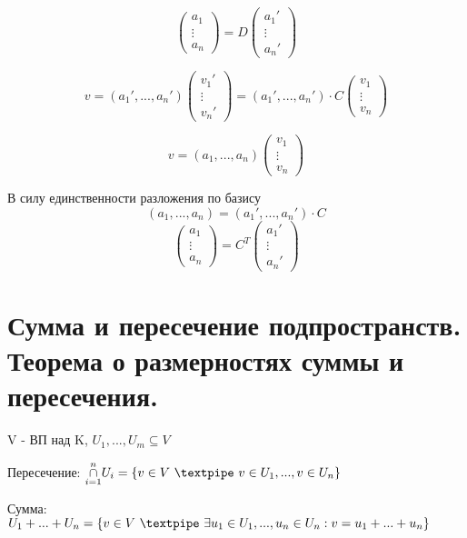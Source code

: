 \documentclass[algebra]{subfiles}
\begin{document}
      \begin{Theorem} 
          \[\begin{pmatrix}
            a_1\\
            \vdots\\
            a_n
          \end{pmatrix} = D
           \begin{pmatrix}
              a_1'\\
            \vdots\\
            a_n'
           \end{pmatrix}\]
      \end{Theorem}

      \begin{Proof}
        \[v = (a_1', ..., a_n') \begin{pmatrix}
          v_1'\\
          \vdots\\
          v_n'
        \end{pmatrix} =
        (a_1', ..., a_n') \cdot C \begin{pmatrix}
          v_1 \\
          \vdots\\
          v_n
        \end{pmatrix} \]

        \[v = (a_1, ..., a_n) \begin{pmatrix}
          v_1\\
          \vdots\\
          v_n
        \end{pmatrix} \]
      \end{Proof}
      В силу единственности разложения по базису
      \[(a_1, ..., a_n) = (a_1', ..., a_n') \cdot C  \]
      \[\begin{pmatrix}
        a_1\\
        \vdots\\
        a_n
      \end{pmatrix} = C^T
      \begin{pmatrix}
        a_1'\\
        \vdots\\
        a_n'
      \end{pmatrix}\]


  \section{Сумма и пересечение подпространств. Теорема о размерностях суммы и пересечения.}
  \begin{definition}
    V - ВП над K, \qq $U_1,...,U_m \subseteq V$

    Пересечение: $\underset{i=1}{\overset{n}{\cap}} U_i = \{ v \in V\ \textpipe\ v \in U_1,...,v \in U_n\}$

    Сумма: $U_1+...+U_n=\{v \in V\ \textpipe\ \exists u_1 \in U_1,...,u_n \in U_n: v=u_1+... + u_n \}$
  \end{definition}
\end{document}
